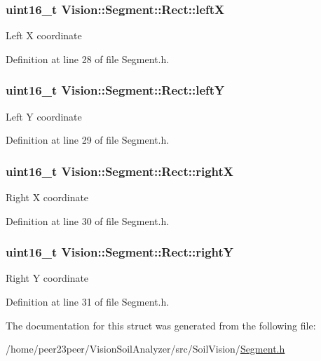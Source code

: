 \subsubsection[{left\+X}]{\setlength{\rightskip}{0pt plus 5cm}uint16\+\_\+t Vision\+::\+Segment\+::\+Rect\+::left\+X}\label{struct_vision_1_1_segment_1_1_rect_acf3a2a045d75348971e57df5eeb7808e}
Left X coordinate 

Definition at line 28 of file Segment.\+h.

\hypertarget{struct_vision_1_1_segment_1_1_rect_ac6d22f96862077f159abc7e1accc20ab}{}
\subsubsection[{left\+Y}]{\setlength{\rightskip}{0pt plus 5cm}uint16\+\_\+t Vision\+::\+Segment\+::\+Rect\+::left\+Y}\label{struct_vision_1_1_segment_1_1_rect_ac6d22f96862077f159abc7e1accc20ab}
Left Y coordinate 

Definition at line 29 of file Segment.\+h.

\hypertarget{struct_vision_1_1_segment_1_1_rect_a6de0dfefe6b8360ee4d57027d1fba928}{}
\subsubsection[{right\+X}]{\setlength{\rightskip}{0pt plus 5cm}uint16\+\_\+t Vision\+::\+Segment\+::\+Rect\+::right\+X}\label{struct_vision_1_1_segment_1_1_rect_a6de0dfefe6b8360ee4d57027d1fba928}
Right X coordinate 

Definition at line 30 of file Segment.\+h.

\hypertarget{struct_vision_1_1_segment_1_1_rect_ab1a913248c715c25362c478498246983}{}
\subsubsection[{right\+Y}]{\setlength{\rightskip}{0pt plus 5cm}uint16\+\_\+t Vision\+::\+Segment\+::\+Rect\+::right\+Y}\label{struct_vision_1_1_segment_1_1_rect_ab1a913248c715c25362c478498246983}
Right Y coordinate 

Definition at line 31 of file Segment.\+h.



The documentation for this struct was generated from the following file\+:\begin{DoxyCompactItemize}
\item 
/home/peer23peer/\+Vision\+Soil\+Analyzer/src/\+Soil\+Vision/\hyperlink{_segment_8h}{Segment.\+h}\end{DoxyCompactItemize}
